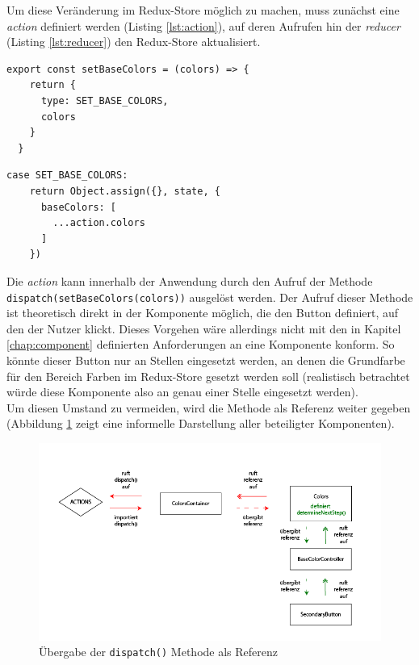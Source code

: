 Um diese Veränderung im Redux-Store möglich zu machen, muss zunächst eine \textit{action} definiert werden (Listing \ref{lst:action}), auf deren Aufrufen hin der \textit{reducer} (Listing \ref{lst:reducer}) den Redux-Store aktualisiert.


\begin{lstlisting}[caption={Definition der \textit{action} zum setzen der Grundfarben}, label=lst:action]
  export const setBaseColors = (colors) => {
    return {
      type: SET_BASE_COLORS,
      colors
    }
  }
\end{lstlisting}

\begin{lstlisting}[caption={Veränderung des Redux-Store beim Aufrauf der \textit{action} \texttt{setBaseColors}}, label=lst:reducer]
  case SET_BASE_COLORS:
    return Object.assign({}, state, {
      baseColors: [
        ...action.colors
      ]
    })
\end{lstlisting}

Die \textit{action} kann innerhalb der Anwendung durch den Aufruf der Methode \texttt{dispatch(setBaseColors(colors))} ausgelöst werden. Der Aufruf dieser Methode ist theoretisch direkt in der Komponente möglich, die den Button definiert, auf den der Nutzer klickt. Dieses Vorgehen wäre allerdings nicht mit den in Kapitel \ref{chap:component} definierten Anforderungen an eine Komponente konform. So könnte dieser Button nur an Stellen eingesetzt werden, an denen die Grundfarbe für den Bereich Farben im Redux-Store gesetzt werden soll (realistisch betrachtet würde diese Komponente also an genau einer Stelle eingesetzt werden).\\
Um diesen Umstand zu vermeiden, wird die Methode als Referenz weiter gegeben (Abbildung \ref{fig:redux_flow} zeigt eine informelle Darstellung aller beteiligter Komponenten).

\begin{figure}[h]
    \centering
    \includegraphics[width=1\textwidth]{images/redux_store_flow.png}
    \caption{Übergabe der \texttt{dispatch()} Methode als Referenz}
    \label{fig:redux_flow}
\end{figure}

